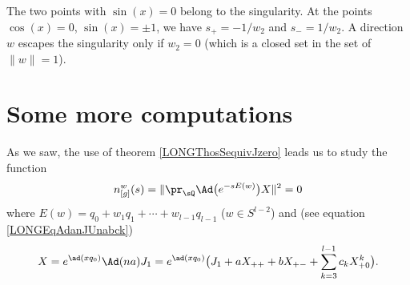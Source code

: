 The two points with $\sin(x)=0$ belong to the singularity. At the points $\cos(x)=0$, $\sin(x)=\pm1$, we have $s_+=-1/w_2$ and $s_-=1/w_2$. A direction $w$ escapes the singularity only if $w_2=0$ (which is a closed set in the set of $\| w \|=1$). 


\newcommand{\CaptionFigSFdgHdO}{Points in $\pi(K)$ are classified by their angle in $\SO(2)$. Red points are part of the singularity, points in the black zone belong to the black hole and points in the green zone are free. The upper and lower boundaries belong to the horizon.}



%
\section{Some more computations}
%
\label{LONGSecMoreComputations}

As we saw, the use of theorem \ref{LONGThosSequivJzero} leads us to study the function
\begin{equation}            \label{LONGEqprSqbignor}
    n_{[g]}^w(s)=\|   \pr_{\sQ} \Ad\big(  e^{-s E(w)} \big)X  \|^2=0
\end{equation}
where $E(w)=q_0+w_1q_1+\cdots+w_{l-1}q_{l-1}$ ($w\in S^{l-2}$) and (see equation \eqref{LONGEqAdanJUnabck})
\begin{equation}
    X=e^{\ad(xq_0)}\Ad(na)J_1=e^{\ad(xq_0)}\big(  J_1+aX_{++}+bX_{+-}+\sum_{k=3}^{l-1}c_kX_{+0}^k\big).
\end{equation}

